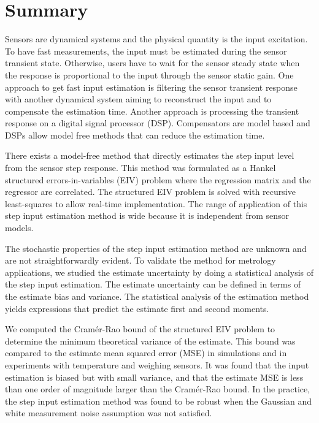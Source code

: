 \chapter{Summary} \label{chap:Summary}

\vspace{-1.2cm}

Sensors are dynamical systems and the physical quantity is the input excitation.
To have fast measurements, the input must be estimated during the sensor transient state.
Otherwise, users have to wait for the sensor steady state when the response is proportional to the input through the sensor static gain.
One approach to get fast input estimation is filtering the sensor transient response with another dynamical system aiming to reconstruct the input and to compensate the estimation time.
Another approach is processing the transient response on a digital signal processor (DSP).
Compensators are model based and DSPs allow model free methods that can reduce the estimation time.

There exists a model-free method that directly estimates the step input level from the sensor step response.
This method was formulated as a Hankel structured errors-in-variables (EIV) problem where the regression matrix and the regressor are correlated.
The structured EIV problem is solved with recursive least-squares to allow real-time implementation.
The range of application of this step input estimation method is wide because it is independent from sensor models.

The stochastic properties of the step input estimation method are unknown and are not straightforwardly evident.
To validate the method for metrology applications, we studied the estimate uncertainty by doing a statistical analysis of the step input estimation.
The estimate uncertainty can be defined in terms of the estimate bias and variance.
The statistical analysis of the estimation method yields expressions that predict the estimate first and second moments.

We computed the Cram\'er-Rao bound of the structured EIV problem to determine the minimum theoretical variance of the estimate.
This bound was compared to the estimate mean squared error (MSE) in simulations and in experiments with temperature and weighing sensors.
It was found that the input estimation is biased but with small variance, and that the estimate MSE is less than one order of magnitude larger than the Cram\'er-Rao bound.
In the practice, the step input estimation method was found to be robust when the Gaussian and white measurement noise assumption was not satisfied.

